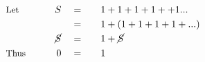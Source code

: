 \begin{alignat*}{5}
&\small\text{Let}\normalsize\qquad&S\quad&=\quad&&1+1+1+1++1...\\
&\,&\,&=&&1+(1+1+1+1+...)\\
&\,&\cancel{S}\quad&=&&1+\cancel{S}\\
&\small\text{Thus}\normalsize\qquad&0\quad&=&&1
\end{alignat*}
